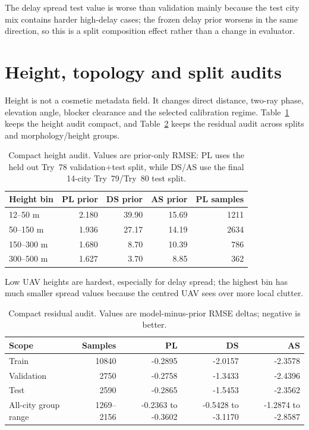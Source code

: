 The delay spread test value is worse than validation mainly because the test
city mix contains harder high-delay cases; the frozen delay prior worsens in
the same direction, so this is a split composition effect rather than a change
in evaluator.

\section{Height, topology and split audits}

Height is not a cosmetic metadata field. It changes direct distance,
two-ray phase, elevation angle, blocker clearance and the selected calibration
regime. Table~\ref{tab:height_topology_audit} keeps the height audit compact,
and Table~\ref{tab:split_group_audit} keeps the residual audit across splits
and morphology/height groups.

\begin{table}[htbp]
\centering
\caption{Compact height audit. Values are prior-only RMSE: PL uses the
held out Try~78 validation+test split, while DS/AS use the final 14-city
Try~79/Try~80 test split.}
\label{tab:height_topology_audit}
\scriptsize
\setlength{\tabcolsep}{4pt}
\begin{tabular}{lrrrr}
\toprule
Height bin & PL prior & DS prior & AS prior & PL samples \\
\midrule
12--50 m & 2.180 & 39.90 & 15.69 & 1211 \\
50--150 m & 1.936 & 27.17 & 14.19 & 2634 \\
150--300 m & 1.680 & 8.70 & 10.39 & 786 \\
300--500 m & 1.627 & 3.70 & 8.85 & 362 \\
\bottomrule
\end{tabular}
\end{table}

Low UAV heights are hardest, especially for delay spread; the highest bin has
much smaller spread values because the centred UAV sees over more local clutter.

\begin{table}[htbp]
\centering
\caption{Compact residual audit. Values are model-minus-prior RMSE deltas; negative is better.}
\label{tab:split_group_audit}
\scriptsize
\setlength{\tabcolsep}{4pt}
\begin{tabular}{lrrrr}
\toprule
Scope & Samples & PL & DS & AS \\
\midrule
Train & 10840 & -0.2895 & -2.0157 & -2.3578 \\
Validation & 2750 & -0.2758 & -1.3433 & -2.4396 \\
Test & 2590 & -0.2865 & -1.5453 & -2.3562 \\
All-city group range & 1269--2156 & -0.2363 to -0.3602 & -0.5428 to -3.1170 & -1.2874 to -2.8587 \\
\bottomrule
\end{tabular}
\end{table}

